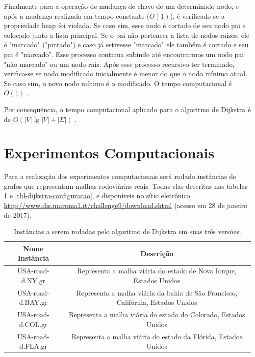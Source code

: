 Finalmente para a operação de mudança de chave de um determinado nodo, e após a mudança realizada em tempo constante ($O(1)$), é verificado se a propriedade heap foi violada. Se caso sim, esse nodo é cortado de seu nodo pai e colocado junto a lista principal. Se o pai não pertencer a lista de nodos raízes, ele é "marcado" ("pintado") e caso já estivesse "marcado" ele também é cortado e seu pai é "marcado". Esse processo continua subindo até encontrarmos um nodo pai "não marcado" ou um nodo raiz. Após esse processo recursivo ter terminado, verifica-se se nodo modificado inicialmente é menor do que o nodo mínimo atual. Se caso sim, o novo nodo mínimo é o modificado. O tempo computacional é $O(1)$ \cite{cormen2009introduction}.

Por consequência, o tempo computacional aplicado para o algoritmo de Dijkstra é de $O(|V|\lg |V| + |E|)$ \cite{cormen2009introduction}.



\section{Experimentos Computacionais}
\label{sec-dijkstra-experimentos}
Para a realização dos experimentos computacionais será rodado instâncias de grafos que representam malhas rodoviárias reais. Todas elas descritas nas tabelas \ref{tbl-dijkstra-instancias} e \ref{tbl-dijkstra-configuracao}, e disponíveis no sítio eletrônico \url{http://www.dis.uniroma1.it/challenge9/download.shtml} (acesso em 28 de janeiro de 2017).
\begin{table}[H]
\caption{Instâncias a serem rodadas pelo algoritmo de Dijkstra em suas três versões.}
\label{tbl-dijkstra-instancias}
\centering
\begin{adjustbox}{max width=\textwidth}
\begin{tabular}{|c|c|}
\hline 
\textbf{Nome Instância} & \textbf{Descrição} \\ 
\hline 
USA-road-d.NY.gr & Representa a malha viária do estado de Nova Iorque, Estados Unidos \\ 
\hline 
USA-road-d.BAY.gr & Representa a malha viária da bahia de São Francisco, Califórnia, Estados Unidos \\ 
\hline 
USA-road-d.COL.gr & Representa a malha viária do estado do Colorado, Estados Unidos \\ 
\hline 
USA-road-d.FLA.gr & Representa a malha viária do estado da Flórida, Estados Unidos \\ 
\hline 
\end{tabular}
\end{adjustbox}
\end{table}

